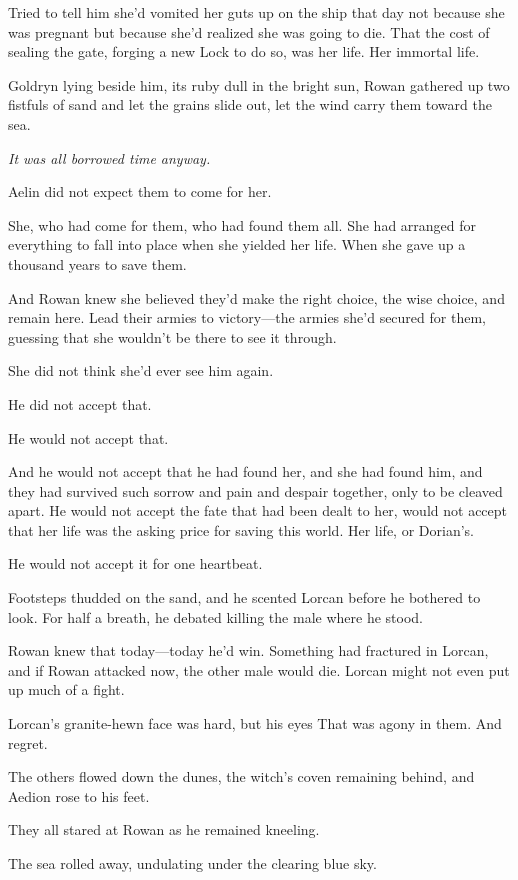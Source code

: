 Tried to tell him she'd vomited her guts up on the ship that day not because she was pregnant but because she'd realized she was going to die. That the cost of sealing the gate, forging a new Lock to do so, was her life. Her immortal life.

Goldryn lying beside him, its ruby dull in the bright sun, Rowan gathered up two fistfuls of sand and let the grains slide out, let the wind carry them toward the sea.

\emph{It was all borrowed time anyway.}

Aelin did not expect them to come for her.

She, who had come for them, who had found them all. She had arranged for everything to fall into place when she yielded her life. When she gave up a thousand years to save them.

And Rowan knew she believed they'd make the right choice, the wise choice, and remain here. Lead their armies to victory---the armies she'd secured for them, guessing that she wouldn't be there to see it through.

She did not think she'd ever see him again.

He did not accept that.

He would not accept that.

And he would not accept that he had found her, and she had found him, and they had survived such sorrow and pain and despair together, only to be cleaved apart. He would not accept the fate that had been dealt to her, would not accept that her life was the asking price for saving this world. Her life, or Dorian's.

He would not accept it for one heartbeat.

Footsteps thudded on the sand, and he scented Lorcan before he bothered to look. For half a breath, he debated killing the male where he stood.

Rowan knew that today---today he'd win. Something had fractured in Lorcan, and if Rowan attacked now, the other male would die. Lorcan might not even put up much of a fight.

Lorcan's granite-hewn face was hard, but his eyes  That was agony in them. And regret.

The others flowed down the dunes, the witch's coven remaining behind, and Aedion rose to his feet.

They all stared at Rowan as he remained kneeling.

The sea rolled away, undulating under the clearing blue sky.

